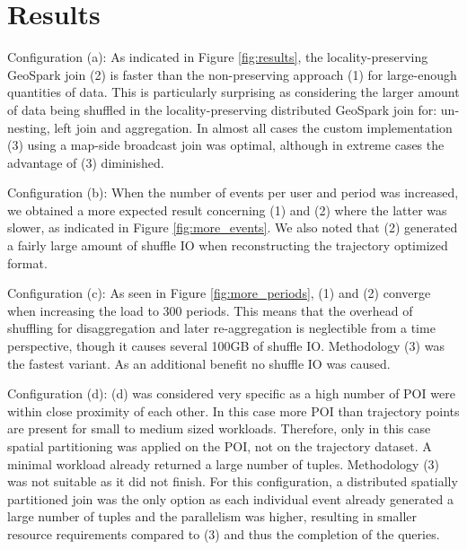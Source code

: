 \documentclass[conference]{IEEEtran}
\begin{document}
\section{Results}
Configuration (a): As indicated in Figure \ref{fig:results}, the locality-preserving GeoSpark join (2) is faster than the non-preserving approach (1) for large-enough quantities of data.
This is particularly surprising as considering the larger amount of data being shuffled in the locality-preserving distributed GeoSpark join for: un-nesting, left join and aggregation.
In almost all cases the custom implementation (3) using a map-side broadcast join was optimal,
although in extreme cases the advantage of (3) diminished.

Configuration (b): When the number of events per user and period was increased, we obtained a more expected result concerning (1) and (2) where the latter was slower, as indicated in Figure \ref{fig:more_events}.
We also noted that (2) generated a fairly large amount of shuffle IO when reconstructing the trajectory optimized format.

Configuration (c): As seen in Figure \ref{fig:more_periods}, (1) and (2) converge when  increasing the load to 300 periods.
This means that the overhead of shuffling for disaggregation and later re-aggregation is neglectible from a time perspective, though it causes several 100GB of shuffle IO.
Methodology (3) was the fastest variant.
As an additional benefit no shuffle IO was caused.

Configuration (d): (d) was considered very specific as a high number of POI were within close proximity of each other.
In this case more POI than trajectory points are present for small to medium sized workloads.
Therefore, only in this case spatial partitioning was applied on the POI, not on the trajectory dataset.
A  minimal workload already returned a large number of tuples.
Methodology (3) was not suitable as it did not finish.
For this configuration, a distributed spatially partitioned join was the
only option as each individual event already generated a large number of tuples and the parallelism was higher, resulting in smaller resource requirements compared to (3) and thus the completion of the queries.
\end{document}
